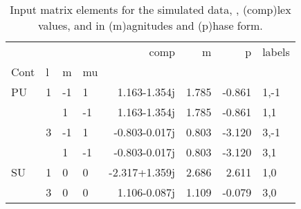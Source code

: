 \begin{table}

\begin{tabular}{llllrrrl}
\toprule
   &   &    &    &          comp &     m &      p & labels \\
Cont & l & m & mu &               &       &        &        \\
\midrule
PU & 1 & -1 &  1 &  1.163-1.354j & 1.785 & -0.861 &   1,-1 \\
   &   &  1 & -1 &  1.163-1.354j & 1.785 & -0.861 &    1,1 \\
   & 3 & -1 &  1 & -0.803-0.017j & 0.803 & -3.120 &   3,-1 \\
   &   &  1 & -1 & -0.803-0.017j & 0.803 & -3.120 &    3,1 \\
SU & 1 &  0 &  0 & -2.317+1.359j & 2.686 &  2.611 &    1,0 \\
   & 3 &  0 &  0 &  1.106-0.087j & 1.109 & -0.079 &    3,0 \\
\bottomrule
\end{tabular}

\caption{\label{tab:matE}Input matrix elements for the simulated data, , (comp)lex values, and in (m)agnitudes and (p)hase form.}
\end{table}